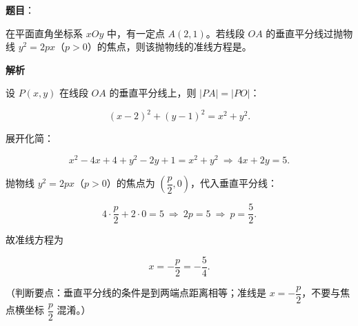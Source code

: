 \begin{answer}

\textbf{题目}：

在平面直角坐标系 $xOy$ 中，有一定点 $A(2,1)$。若线段 $OA$ 的垂直平分线过抛物线 $y^2=2px$（$p>0$）的焦点，则该抛物线的准线方程是\gkblank{}。

\textbf{解析}

设 $P(x,y)$ 在线段 $OA$ 的垂直平分线上，则 $|PA|=|PO|$：

\nopagebreak[4]
\[(x-2)^2+(y-1)^2=x^2+y^2.\]

展开化简：

\nopagebreak[4]
\[x^2-4x+4+y^2-2y+1=x^2+y^2\ \Rightarrow\ 4x+2y=5.\]

抛物线 $y^2=2px$（$p>0$）的焦点为 $\left(\dfrac p2,0\right)$，代入垂直平分线：

\nopagebreak[4]
\[4\cdot\frac p2+2\cdot0=5\ \Rightarrow\ 2p=5\ \Rightarrow\ p=\frac52.\]

故准线方程为

\nopagebreak[4]
\[x=-\frac p2=-\frac54.\]

（判断要点：垂直平分线的条件是到两端点距离相等；准线是 $x=-\dfrac p2$，不要与焦点横坐标 $\dfrac p2$ 混淆。）


\end{answer}
